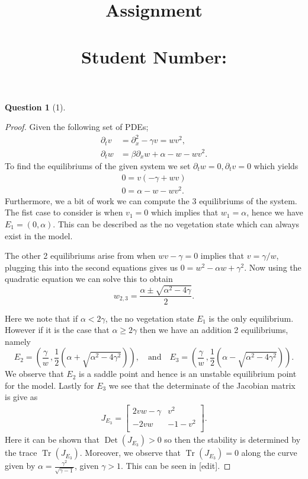 \documentclass[11pt]{article}
\author{}
\title{\vspace{-50pt}
    \Huge \subject \\ Assignment \hw
\\ \vspace{20pt} \large \name \\ Student Number:\SID}
\date{}
\theoremstyle{quest}
\newtheorem*{question}{Question}
\newcommand{\Dp}{\partial}
\DeclareMathOperator{\Tr}{Tr}
\DeclareMathOperator{\Det}{Det}
\begin{document}
\maketitle{}




\begin{question}[1]
\end{question}
\begin{proof}
    Given the following set of PDEs;
    \begin{align*}
        \Dp_t v &= \Dp_{x}^{2} - \gamma v = wv^2, \\
        \Dp_t w &= \beta \Dp_x w +\alpha -w -wv^2.
    \end{align*}
    To find the equilibriums of the given system we set $ \Dp_t w = 0, \Dp_t v = 0$ which yields
    \begin{align*}
        0= v \left( -\gamma + w v \right)\\
        0= \alpha -w -wv^2.
    \end{align*}
    Furthermore, we a bit of work we can compute the 3 equilibriums of the system.
    The fist case to consider is when $v_1 =0$ which implies that $w_1 =\alpha$, hence we have
    $E_1 = \left( 0, \alpha  \right)$. This can be described as the no vegetation state which
    can always exist in the model.

    The other 2 equilibriums arise from when $ wv-\gamma =0$ implies that $v=\gamma / w$, plugging this
    into the second equations gives us $0=w^2 - \alpha w + \gamma^2$. Now using the quadratic equation
    we can solve this to obtain $$ w_{2,3} = \frac{\alpha \pm \sqrt{ \alpha^2 - 4 \gamma }}{2}.$$

    Here we note that if $\alpha < 2 \gamma$, the no vegetation state $E_1$ is the only equilibrium.
    However if it is the case that $ \alpha \geq 2 \gamma$ then we have an addition 2 equilibriums, namely
    $$ E_2 = \left( \frac{\gamma }{w} \, , \frac{1}{2}\left(\alpha + \sqrt{\alpha^2 -4\gamma^2} \right)  \right),
    \quad \text{and} \quad E_3 = \left( \frac{\gamma }{w}\, , \frac{1}{2} \left(\alpha -\sqrt{\alpha^2 -4\gamma^2} \right)  \right). $$
    We observe that $E_2$ is a saddle point and hence is an unstable equilibrium point for the model.
    Lastly for $E_3$ we see that the determinate of the Jacobian matrix is give as
    \begin{align*}
        J_{E_3} = 
        \begin{bmatrix}
            2vw - \gamma & v^2 \\
            -2vw & -1 -v^2 \\
        \end{bmatrix}
        .
    \end{align*}
    Here it can be shown that $\Det(J_{E_3}) > 0$ so then the stability is determined by the trace $\Tr(J_{E_3})$.
    Moreover, we observe that $\Tr(J_{E_3}) = 0$ along the curve given by $\alpha = \frac{\gamma^2}{\sqrt{\gamma-1}}$, given
    $\gamma > 1$. This can be seen in [edit].
\end{proof}
\clearpage
\end{document}
